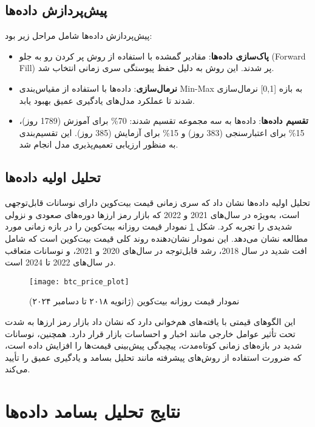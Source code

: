 \subsection{پیش‌پردازش داده‌ها}
پیش‌پردازش داده‌ها شامل مراحل زیر بود:
\begin{itemize}
	\item \textbf{پاک‌سازی داده‌ها}: مقادیر گمشده با استفاده از روش پر کردن رو به جلو (Forward Fill) پر شدند. این روش به دلیل حفظ پیوستگی سری زمانی انتخاب شد.
	\item \textbf{نرمال‌سازی}: داده‌ها با استفاده از مقیاس‌بندی Min-Max به بازه [0,1] نرمال‌سازی شدند تا عملکرد مدل‌های یادگیری عمیق بهبود یابد.
	\item \textbf{تقسیم داده‌ها}: داده‌ها به سه مجموعه تقسیم شدند: 70\% برای آموزش (1789 روز)، 15\% برای اعتبارسنجی (383 روز) و 15\% برای آزمایش (385 روز). این تقسیم‌بندی به منظور ارزیابی تعمیم‌پذیری مدل انجام شد.
\end{itemize}

\subsection{تحلیل اولیه داده‌ها}
تحلیل اولیه داده‌ها نشان داد که سری زمانی قیمت بیت‌کوین دارای نوسانات قابل‌توجهی است، به‌ویژه در سال‌های 2021 و 2022 که بازار رمز ارزها دوره‌های صعودی و نزولی شدیدی را تجربه کرد. شکل \ref{fig:btc_price} نمودار قیمت روزانه بیت‌کوین را در بازه زمانی مورد مطالعه نشان می‌دهد. این نمودار نشان‌دهنده روند کلی قیمت بیت‌کوین است که شامل افت شدید در سال 2018، رشد قابل‌توجه در سال‌های 2020 و 2021، و نوسانات متعاقب در سال‌های 2022 تا 2024 است.

\begin{figure}[H]
	\centering
	\texttt{[image: btc\_price\_plot]}
	\caption{نمودار قیمت روزانه بیت‌کوین (ژانویه ۲۰۱۸ تا دسامبر ۲۰۲۴)}
	\label{fig:btc_price}
\end{figure}

این الگوهای قیمتی با یافته‌های \cite{urquhart2016inefficiency} هم‌خوانی دارد که نشان داد بازار رمز ارزها به شدت تحت تأثیر عوامل خارجی مانند اخبار و احساسات بازار قرار دارد. همچنین، نوسانات شدید در بازه‌های زمانی کوتاه‌مدت، پیچیدگی پیش‌بینی قیمت‌ها را افزایش داده است، که ضرورت استفاده از روش‌های پیشرفته مانند تحلیل بسامد و یادگیری عمیق را تأیید می‌کند.

\section{نتایج تحلیل بسامد داده‌ها}
\label{sec:frequency_results}

